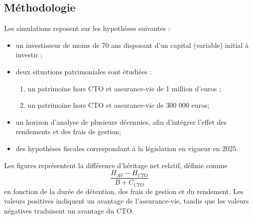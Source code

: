 \subsection{Méthodologie}
\label{sec:methodologie_sans_retrait}

Les simulations reposent sur les hypothèses suivantes :
\begin{itemize}
    \item un investisseur de moins de 70 ans disposant d'un capital (variable) initial à investir ;
    \item deux situations patrimoniales sont étudiées :
    \begin{enumerate}
        \item un patrimoine hors CTO et assurance-vie de 1 million d'euros ;
        \item un patrimoine hors CTO et assurance-vie de 300 000 euros;
    \end{enumerate}
    \item un horizon d'analyse de plusieurs décennies, afin d'intégrer l'effet des rendements et des frais de gestion;
    \item des hypothèses fiscales correspondant à la législation en vigueur en 2025.
\end{itemize}
Les figures représentent la différence d'héritage net relatif, définie comme
\begin{equation}
    \frac{H_{AV} - H_{CTO}}{B + C_{CTO}}
\end{equation}
en fonction de la durée de détention, des frais de gestion et du rendement. Les valeurs positives indiquent un avantage de l'assurance-vie, tandis que les valeurs négatives traduisent un avantage du CTO.
